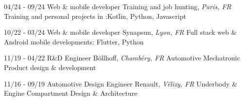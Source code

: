 \documentclass[]{friggeri-cv}
\begin{document}
\begin{entrylist}
  \entry
    {04/24 - 09/24}
    {Web \& mobile developer}
    {Training and job hunting, \textit{Paris, FR}}
    {Training and personal projects in :\hspace*{8mm}Kotlin, Python, Javascript}
\end{entrylist}

\begin{entrylist}
  \entry
    {10/22 - 03/24}
    {Web \& mobile developer}
    {Synapsun, \textit{Lyon, FR}}
    {Full stack web \& Android mobile developments: \hspace*{8mm}Flutter, Python}
\end{entrylist}

\begin{entrylist}
  \entry
    {11/19 - 04/22}
    {R\&D Engineer}
    {Böllhoff, \textit{Chambéry, FR}}
    {Automotive Mechatronic Product design \& development}
\end{entrylist}

\begin{entrylist}
  \entry
    {11/16 - 09/19}
    {Automotive Design Engineer}
    {Renault, \textit{Vélizy, FR}}
    {Underbody \& Engine Compartment Design \& Architecture}
\end{entrylist}

\vspace*{-0.5cm}
\vspace*{0.45cm}
\end{document}
